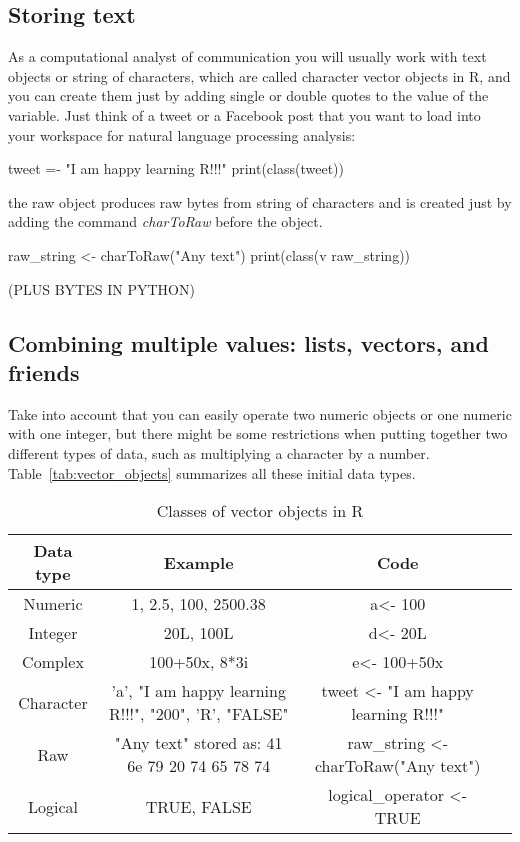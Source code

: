 \subsection{Storing text}


As a computational analyst of communication you will usually work with text objects or string of characters, which are called character vector objects in R, and you can create them just by adding single or double quotes to the value of the variable. Just think of a tweet or a Facebook post that you want to load into your workspace for natural language processing analysis:

\begin{exampler}
tweet =- "I am happy learning R!!!"
print(class(tweet))
\end{exampler}



 the raw object produces raw bytes from string of characters and is created just by adding the command \emph{charToRaw} before the object. 

\begin{exampler}
raw_string <- charToRaw("Any text")
print(class(v raw_string))
\end{exampler}

(PLUS BYTES IN PYTHON)



\subsection{Combining multiple values: lists, vectors, and friends}



Take into account that you can easily operate two numeric objects or one numeric with one integer, but there might be some restrictions when putting together two different types of data, such as multiplying a character by a number. Table~\ref{tab:vector_objects} summarizes all these initial data types.

\begin{table}[ht]
\label{tab:vector_objects}
\caption{Classes of vector objects in R}
\centering
\begin{tabular}{c c c p{2cm}}
\hline\hline
Data type & Example & Code \\ [0.5ex]
\hline
Numeric&1, 2.5, 100, 2500.38& a\textless- 100 \\
Integer&20L, 100L&d\textless- 20L \\
Complex& 100+50x, 8*3i &e\textless- 100+50x \\
Character&   \parbox[t]{4cm}{\centering 'a', "I am happy learning R!!!", "200", 'R', "FALSE"} & tweet \textless- "I am happy learning R!!!" \\
Raw& \parbox[t]{4cm}{\centering "Any text" stored as:  41 6e 79 20 74 65 78 74} & raw\_string \textless- charToRaw("Any text") \\
Logical& TRUE, FALSE & logical\_operator \textless- TRUE  \\ [1ex]
\hline
\end{tabular}
\label{table:nonlin}
\end{table}

